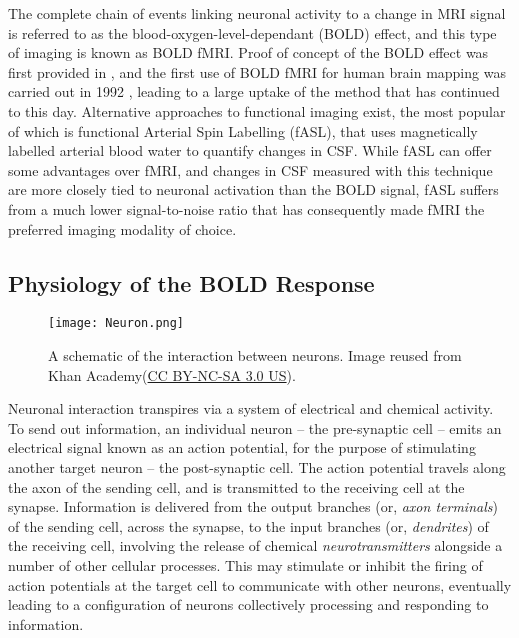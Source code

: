 The complete chain of events linking neuronal activity to a change in MRI signal is referred to as the blood-oxygen-level-dependant (BOLD) effect, and this type of imaging is known as BOLD fMRI.  Proof of concept of the BOLD effect was first provided in \citet*{Ogawa1990-it}, and the first use of BOLD fMRI for human brain mapping was carried out in 1992 \citep{Bandettini1992-jt, Kwong1992-uq, Ogawa1992-af}, leading to a large uptake of the method that has continued to this day. Alternative approaches to functional imaging exist, the most popular of which is functional Arterial Spin Labelling (fASL), that uses magnetically labelled arterial blood water to quantify changes in CSF. While fASL can offer some advantages over fMRI, and changes in CSF measured with this technique are more closely tied to neuronal activation than the BOLD signal, fASL suffers from a much lower signal-to-noise ratio that has consequently made fMRI the preferred imaging modality of choice. 

\subsection{Physiology of the BOLD Response}

\begin{figure}[htbp]
\centering
	\texttt{[image: Neuron.png]}	
\caption[A schematic of the interaction between neurons. Image reused from Khan Academy.]{A schematic of the interaction between neurons. Image reused from Khan Academy\footnotemark[1] (\href{https://creativecommons.org/licenses/by-nc-sa/3.0/us/}{CC BY-NC-SA 3.0 US}).}
\end{figure}


Neuronal interaction transpires via a system of electrical and chemical activity. To send out information, an individual neuron -- the pre-synaptic cell -- emits an electrical signal known as an action potential, for the purpose of stimulating another target neuron -- the post-synaptic cell. The action potential travels along the axon of the sending cell, and is transmitted to the receiving cell at the synapse. Information is delivered from the output branches (or, \textit{axon terminals}) of the sending cell, across the synapse, to the input branches (or, \textit{dendrites}) of the receiving cell, involving the release of chemical \textit{neurotransmitters} alongside a number of other cellular processes. This may stimulate or inhibit the firing of action potentials at the target cell to communicate with other neurons, eventually leading to a configuration of neurons collectively processing and responding to information. 

